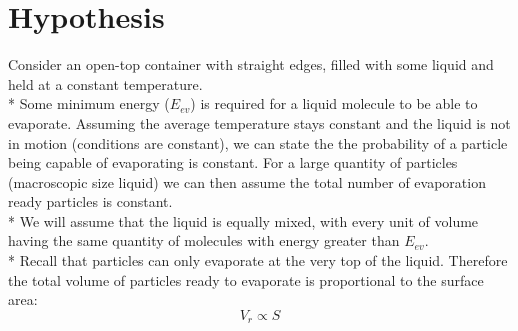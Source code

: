 \documentclass[12pt,letterpaper,final]{report}
\begin{document}
\section{Hypothesis}
Consider an open-top container with straight edges, filled with some liquid and held at a constant temperature. 
\medskip
\\* Some minimum energy ($E_{ev}$) is required for a liquid molecule to be able to evaporate. Assuming the average temperature stays constant and the liquid is not in motion (conditions are constant), we can state the the probability of a particle being capable of evaporating is constant. For a large quantity of particles (macroscopic size liquid) we can then assume the total number of evaporation ready particles is constant.
\medskip
\\* We will assume that the liquid is equally mixed, with every unit of volume having the same quantity of molecules with energy greater than $E_{ev}$. 
\medskip
\\* Recall that particles can only evaporate at the very top of the liquid. Therefore the total volume of particles ready to evaporate is proportional to the surface area:
\medskip
\begin{equation}\label{eq:prop1}
V_{r} \propto  S 
\end{equation}
\medskip
\end{document}
